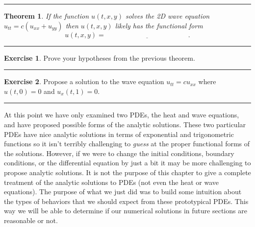 \documentclass[
]{book}
\newtheorem{theorem}{Theorem}[chapter]
\theoremstyle{definition}
\theoremstyle{definition}
\theoremstyle{definition}
\newtheorem{exercise}{Exercise}[chapter]
\theoremstyle{remark}
\begin{document}
\begin{center}\rule{0.5\linewidth}{0.5pt}\end{center}

\begin{theorem}
\protect\hypertarget{thm:unnamed-chunk-537}{}{\label{thm:unnamed-chunk-537} }If the function \(u(t,x,y)\) solves the 2D wave equation \(u_{tt} = c \left( u_{xx} + u_{yy} \right)\) then \(u(t,x,y)\) likely has the functional form
\[u(t,x,y) = \underline{\hspace{2in}}.\]
\end{theorem}

\begin{center}\rule{0.5\linewidth}{0.5pt}\end{center}

\begin{exercise}
\protect\hypertarget{exr:unnamed-chunk-538}{}{\label{exr:unnamed-chunk-538} }Prove your hypotheses from the previous theorem.
\end{exercise}

\begin{center}\rule{0.5\linewidth}{0.5pt}\end{center}

\begin{exercise}
\protect\hypertarget{exr:unnamed-chunk-539}{}{\label{exr:unnamed-chunk-539} }Propose a solution to the wave equation \(u_{tt} = c u_{xx}\) where \(u(t,0) = 0\) and \(u_x(t,1)=0\).
\end{exercise}

\begin{center}\rule{0.5\linewidth}{0.5pt}\end{center}

At this point we have only examined two PDEs, the heat and wave equations, and have proposed possible forms of the analytic solutions. These two particular PDEs have nice analytic solutions in terms of exponential and trigonometric functions so it isn't terribly challenging to \emph{guess} at the proper functional forms of the solutions. However, if we were to change the initial conditions, boundary conditions, or the differential equation by just a bit it may be more challenging to propose analytic solutions. It is not the purpose of this chapter to give a complete treatment of the analytic solutions to PDEs (not even the heat or wave equations). The purpose of what we just did was to build some intuition about the types of behaviors that we should expect from these prototypical PDEs. This way we will be able to determine if our numerical solutions in future sections are reasonable or not.
\end{document}
